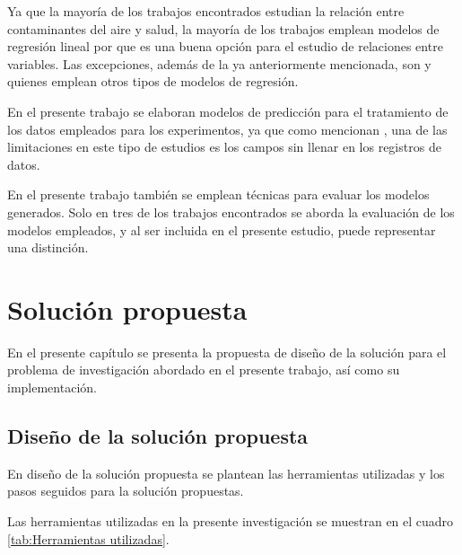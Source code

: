 Ya que la mayoría de los trabajos encontrados estudian la relación entre contaminantes del aire y salud, la mayoría de los trabajos emplean modelos de regresión lineal por que es una buena opción para el estudio de relaciones entre variables. Las excepciones, además de la ya anteriormente mencionada, son \citet{r17} y \citet{r18} quienes emplean otros tipos de modelos de regresión.

En el presente trabajo se elaboran modelos de predicción para el tratamiento de los datos empleados para los experimentos, ya que como mencionan \citet{r15}, una de las limitaciones en este tipo de estudios es los campos sin llenar en los registros de datos.

En el presente trabajo también se emplean técnicas para evaluar los modelos generados. Solo en tres de los trabajos encontrados se aborda la evaluación de los modelos empleados, y al ser incluida en el presente estudio, puede representar una distinción.

\chapter{Solución propuesta}
En el presente capítulo se presenta la propuesta de diseño de la solución para el problema de investigación abordado en el presente trabajo, así como su implementación.

\section{Diseño de la solución propuesta} \label{Diseño de la solución propuesta}
En diseño de la solución propuesta se plantean las herramientas utilizadas y los pasos seguidos para la solución propuestas.

Las herramientas utilizadas en la presente investigación se muestran en el cuadro \ref{tab:Herramientas utilizadas}.

